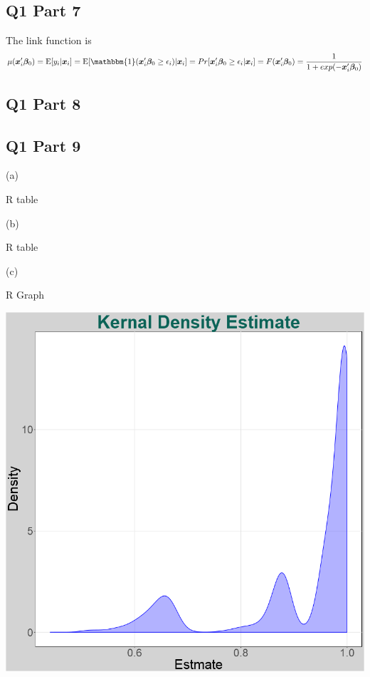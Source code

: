 \documentclass[11pt]{article}
\newcommand{\E}{\mathrm{E}}
\begin{document}
\subsection{Q1 Part 7}
The link function is 
$$\mu(\bm{x}'_i \bm{\beta}_0) = \E[y_i|\bm{x}_i] = \E[\mathbbm{1}(\bm{x}'_i \bm{\beta}_0 \geq \epsilon_i)|\bm{x}_i] =Pr[\bm{x}'_i \bm{\beta}_0 \geq \epsilon_i|\bm{x}_i] = F(\bm{x}'_i \bm{\beta}_0) = \frac{1}{1+exp(-\bm{x}'_i \bm{\beta}_0)}
$$
\subsection{Q1 Part 8}



\subsection{Q1 Part 9 }
(a)\\

\centerline{R table }

\begin{center}
	
\end{center}



(b)

\centerline{R table }

\begin{center}
	
\end{center}


(c)
\centerline{R Graph }
\begin{center}
	\includegraphics[width=.8\linewidth]{plot_q1_9_c.png}
	
\end{center}
\end{document}
